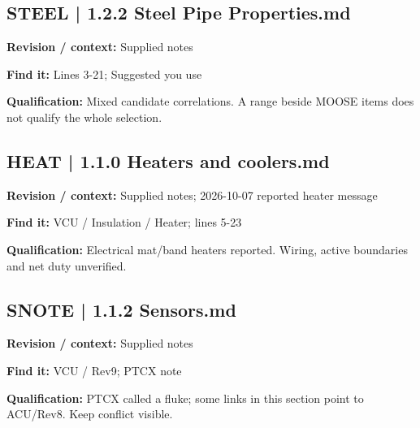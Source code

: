 \documentclass[11pt]{article}
\begin{document}
\par\noindent\begin{minipage}{\textwidth}\small
\subsection*{STEEL | 1.2.2 Steel Pipe Properties.md}
\textbf{Revision / context:} Supplied notes\par
\textbf{Find it:} Lines 3-21; Suggested you use\par
\textbf{Qualification:} Mixed candidate correlations. A range beside MOOSE items does not qualify the whole selection.\par
\end{minipage}\par\vspace{5pt}
\par\noindent\begin{minipage}{\textwidth}\small
\subsection*{HEAT | 1.1.0 Heaters and coolers.md}
\textbf{Revision / context:} Supplied notes; 2026-10-07 reported heater message\par
\textbf{Find it:} VCU / Insulation / Heater; lines 5-23\par
\textbf{Qualification:} Electrical mat/band heaters reported. Wiring, active boundaries and net duty unverified.\par
\end{minipage}\par\vspace{5pt}
\par
\par\noindent\begin{minipage}{\textwidth}\small
\subsection*{SNOTE | 1.1.2 Sensors.md}
\textbf{Revision / context:} Supplied notes\par
\textbf{Find it:} VCU / Rev9; PTCX note\par
\textbf{Qualification:} PTCX called a fluke; some links in this section point to ACU/Rev8. Keep conflict visible.\par
\end{minipage}\par\vspace{5pt}
\end{document}
